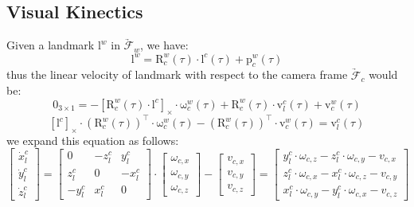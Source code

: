 \documentclass[12pt, onecolumn]{article}
\newcommand\liehat[1]{\left[ #1 \right]_\times}
\newcommand\bsm[1]{\boldsymbol{\mathrm{#1}}}
\newcommand\rotation[2]{{\bsm{R}_{#1}^{#2}}}
\newcommand\angvel[2]{{\bsm{\omega}_{#1}^{#2}}}
\newcommand\translation[2]{{\bsm{p}_{#1}^{#2}}}
\newcommand\linvel[2]{{\bsm{v}_{#1}^{#2}}}
\newcommand\coordframe[1]{\underrightarrow{\mathcal{F}}_{#1}}
\begin{document}
	\subsection{Visual Kinectics}
	Given a landmark $\bsm{l}^{w}$ in $\coordframe{w}$, we have:
	\begin{equation}
	\bsm{l}^{w}=\rotation{c}{w}(\tau)\cdot\bsm{l}^{c}(\tau)+\translation{c}{w}(\tau)
	\end{equation}
	thus the linear velocity of landmark with respect to the camera frame $\coordframe{c}$ would be:
	\begin{equation}
	\bsm{0}_{3\times 1}=-\liehat{\rotation{c}{w}(\tau)\cdot\bsm{l}^{c}}\cdot\angvel{c}{w}(\tau)+\rotation{c}{w}(\tau)\cdot\linvel{l}{c}(\tau)+\linvel{c}{w}(\tau)
	\end{equation}
	\begin{equation}
	\liehat{\bsm{l}^{c}}\cdot\left( \rotation{c}{w}(\tau)\right)^\top\cdot\angvel{c}{w}(\tau)-\left( \rotation{c}{w}(\tau)\right)^\top\cdot\linvel{c}{w}(\tau)=\linvel{l}{c}(\tau)
	\end{equation}	
	we expand this equation as follows:
	\begin{equation}
	\begin{bmatrix}
		\dot{x}^c_l\\
		\dot{y}^c_l\\
		\dot{z}^c_l
		\end{bmatrix}=
	\begin{bmatrix}
	0&-z_l^c&y_l^c\\
	z_l^c&0&-x_l^c \\
	-y_l^c&x_l^c&0
	\end{bmatrix}\cdot
	\begin{bmatrix}
	\omega_{c,x}\\
	\omega_{c,y}\\
	\omega_{c,z}
	\end{bmatrix}-
	\begin{bmatrix}
	v_{c,x}\\
	v_{c,y}\\
	v_{c,z}
	\end{bmatrix}=\begin{bmatrix}
	y_l^c\cdot\omega_{c,z}-z_l^c\cdot\omega_{c,y}-v_{c,x}\\
	z_l^c\cdot\omega_{c,x}-x_l^c\cdot\omega_{c,z}-v_{c,y}\\
	x_l^c\cdot\omega_{c,y}-y_l^c\cdot\omega_{c,x}-v_{c,z}
	\end{bmatrix}
	\end{equation}
	
\end{document}
